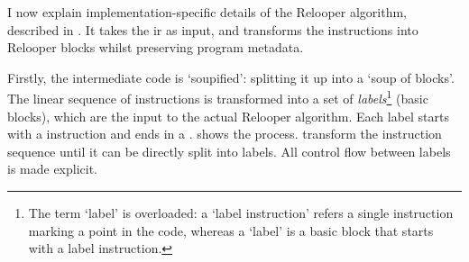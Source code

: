 \documentclass[00-main.tex]{subfiles}
\begin{document}
I now explain implementation-specific details of the Relooper algorithm, described in .
It takes the \gls{ir} as input, and transforms the instructions into Relooper blocks whilst preserving program metadata.

Firstly, the intermediate code is `soupified': splitting it up into a `soup of blocks'.
The linear sequence of instructions is transformed into a set of \emph{labels}\footnote{The term `label' is overloaded: a `label instruction' refers a single instruction marking a point in the code, whereas a `label' is a basic block that starts with a label instruction.} (basic blocks), which are the input to the actual Relooper algorithm.
Each label starts with a  instruction and ends in a .
 shows the process.
 transform the instruction sequence until it can be directly split into labels.
All control flow between labels is made explicit.
\end{document}
